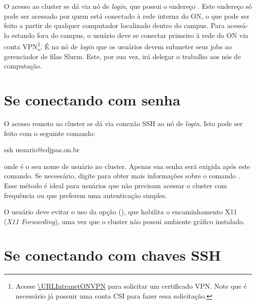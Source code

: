 O acesso ao cluster se dá via nó de \textit{login}, que possui o endereço .
Este endereço só pode ser acessado por quem está conectado à rede interna do ON, o que pode ser feito a partir de qualquer computador localizado dentro do campus.
Para acessá-lo estando fora do campus, o usuário deve se conectar primeiro à rede do ON via conta VPN\footnote{Acesse \url{\URLIntranetONVPN} para solicitar um certificado VPN. Note que é necessário já possuir uma conta CSI para fazer essa solicitação.}.
É no nó de \textit{login} que os usuários devem submeter seus jobs ao gerenciador de filas Slurm.
Este, por sua vez, irá delegar o trabalho aos nós de computação.




\section{Se conectando com senha}
\label{sec:se-conectando-com-senha}

O acesso remoto ao cluster se dá via conexão SSH ao nó de \textit{login}.
Isto pode ser feito com o seguinte comando:

\begin{terminal}
    ssh usuario@cdjpas.on.br
\end{terminal}

\noindent onde  é o seu nome de usuário no cluster.
Apenas sua senha será exigida após este comando.
Se necessário, digite  para obter mais informações sobre o comando .
Esse método é ideal para usuários que não precisam acessar o cluster com frequência ou que preferem uma autenticação simples.

\begin{warning}
    O usuário deve evitar o uso da opção  (), que habilita o encaminhamento X11 (\textit{X11 Forwarding}), uma vez que o cluster não possui ambiente gráfico instalado.
\end{warning}



\section{Se conectando com chaves SSH}
\label{sec:se-conectando-com-chaves-ssh}

